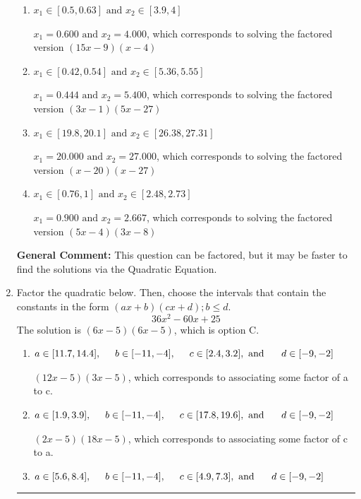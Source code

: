 \documentclass{extbook}[14pt]
\newcommand{\litem}[1]{\item #1

\rule{\textwidth}{0.4pt}}
\begin{document}
\begin{enumerate}
{\begin{enumerate}[label=\Alph*.]
* $x_1 = 1.333 \text{ and } x_2 = 1.800$, which is the correct option. Obtained by solving the factored version $(3x -4)(5x -9)$
\item \( x_1 \in [0.5, 0.63] \text{ and } x_2 \in [3.9, 4] \)

$x_1 = 0.600 \text{ and } x_2 = 4.000$, which corresponds to solving the factored version $(15x -9)(x -4)$
\item \( x_1 \in [0.42, 0.54] \text{ and } x_2 \in [5.36, 5.55] \)

$x_1 = 0.444 \text{ and } x_2 = 5.400$, which corresponds to solving the factored version $(3x -1)(5x -27)$
\item \( x_1 \in [19.8, 20.1] \text{ and } x_2 \in [26.38, 27.31] \)

$x_1 = 20.000 \text{ and } x_2 = 27.000$, which corresponds to solving the factored version $(x -20)(x -27)$
\item \( x_1 \in [0.76, 1] \text{ and } x_2 \in [2.48, 2.73] \)

$x_1 = 0.900 \text{ and } x_2 = 2.667$, which corresponds to solving the factored version $(5x -4)(3x -8)$
\end{enumerate}

\textbf{General Comment:} This question can be factored, but it may be faster to find the solutions via the Quadratic Equation.
}
\litem{
Factor the quadratic below. Then, choose the intervals that contain the constants in the form $(ax+b)(cx+d); b \leq d.$
\[ 36x^{2} -60 x + 25 \]The solution is \( (6x -5)(6x -5) \), which is option C.\begin{enumerate}[label=\Alph*.]
\item \( a \in [11.7, 14.4], \hspace*{5mm} b \in [-11, -4], \hspace*{5mm} c \in [2.4, 3.2], \text{ and } \hspace*{5mm} d \in [-9, -2] \)

 $(12x -5)(3x -5)$, which corresponds to associating some factor of a to c.
\item \( a \in [1.9, 3.9], \hspace*{5mm} b \in [-11, -4], \hspace*{5mm} c \in [17.8, 19.6], \text{ and } \hspace*{5mm} d \in [-9, -2] \)

 $(2x -5)(18x -5)$, which corresponds to associating some factor of c to a.
\item \( a \in [5.6, 8.4], \hspace*{5mm} b \in [-11, -4], \hspace*{5mm} c \in [4.9, 7.3], \text{ and } \hspace*{5mm} d \in [-9, -2] \)


\end{enumerate}}
\end{enumerate}
\end{document}
